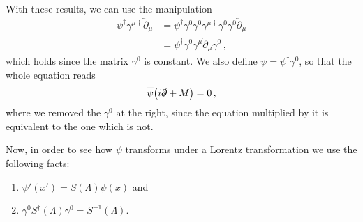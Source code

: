 \documentclass[main.tex]{subfiles}
\begin{document}
With these results, we can use the manipulation 
%
\begin{align}
\psi ^\dag \gamma^{\mu \dag} \overleftarrow{\partial}_{\mu } &= 
\psi ^\dag \gamma^{0} \gamma^{0} \gamma^{\mu \dag} \gamma^{0} \gamma^{0} \overleftarrow{\partial}_{\mu }  \\
&= \psi ^\dag \gamma^{0} \gamma^{\mu } \overleftarrow{\partial}_{\mu } \gamma^{0}
\,,
\end{align}
%
which holds since the matrix \(\gamma^{0}\) is constant.
We also define \(\overline{\psi} = \psi ^\dag \gamma^{0}\), so that the whole equation reads 
%
\begin{align}
\overline{\psi} \qty(i \slashed{\partial} + M ) =0 
\,,
\end{align}
%
where we removed the \(\gamma^{0}\) at the right, since the equation multiplied by it is equivalent to the one which is not. 

Now, in order to see how \(\overline{\psi}\) transforms under a Lorentz transformation we use the following facts: 
\begin{enumerate}
  \item \(\psi' (x' ) = S(\Lambda ) \psi (x)\) and 
  \item \(\gamma^{0} S ^\dag (\Lambda ) \gamma^{0} = S^{-1}(\Lambda )\).
\end{enumerate}
\end{document}
